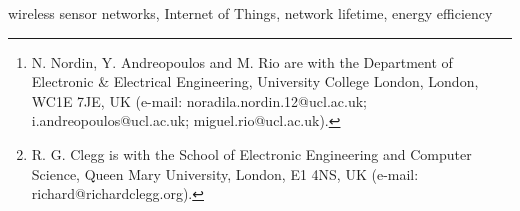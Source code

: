 \documentclass[journal]{IEEEtran}
\begin{document}
\title{}

\author{Noradila Nordin,
        Richard G Clegg,
        Yiannis Andreopoulos,
        and Miguel Rio%
\thanks{N. Nordin, Y. Andreopoulos and M. Rio are with the Department
of Electronic \& Electrical Engineering, University College London, London,
WC1E 7JE, UK (e-mail: noradila.nordin.12@ucl.ac.uk; i.andreopoulos@ucl.ac.uk; miguel.rio@ucl.ac.uk).}%
\thanks{R. G. Clegg is with the School of Electronic Engineering and Computer Science, Queen Mary University, London, E1 4NS, UK (e-mail: richard@richardclegg.org).}%
}



\maketitle




\begin{IEEEkeywords}
wireless sensor networks, Internet of Things, network lifetime, energy efficiency
\end{IEEEkeywords}

\IEEEpeerreviewmaketitle




%




%




\label{references}



\end{document}
